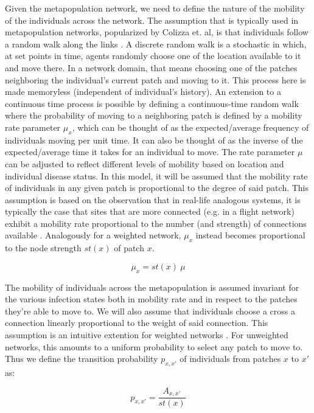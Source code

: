 Given the metapopulation network, we need to define the nature of the mobility of the individuals across the network. The assumption that is typically used in metapopulation networks, popularized by Colizza et. al, is that individuals follow a random walk along the links \cite{colizza2008epidemic}. A discrete random walk is a stochastic in which, at set points in time, agents randomly choose one of the location available to it and move there. In a network domain, that means choosing one of the patches neighboring the individual's current patch and moving to it. This process here is made memoryless (independent of individual's history). An extension to a continuous time process is possible by defining a continuous-time random walk where the probability of moving to a neighboring patch is defined by a mobility rate parameter $\mu_x$, which can be thought of as the expected/average frequency of individuals moving per unit time. It can also be thought of as the inverse of the expected/average time it takes for an individual to move. The rate parameter $\mu$ can be adjusted to reflect different levels of mobility based on location and individual disease status. In this model, it will be assumed that the mobility rate of individuals in any given patch is proportional to the degree of said patch. This assumption is based on the observation that in real-life analogous systems, it is typically the case that sites that are more connected (e.g. in a flight network) exhibit a mobility rate proportional to the number (and strength) of connections available \cite{colizza2006role}. Analogously for a weighted network, $\mu_x$ instead becomes proportional to the node strength $st(x)$ of patch $x$.

\begin{equation}
    \mu_x= st(x) \ \mu
\end{equation}

The mobility of individuals across the metapopulation is assumed invariant for the various infection states both in mobility rate and in respect to the patches they're able to move to. We will also assume that individuals choose a cross a connection linearly proportional to the weight of said connection. This assumption is an intuitive extention for weighted networks \cite{10.1093/comnet/cnab032}. For unweighted networks, this amounts to a uniform probability to select any patch to move to. Thus we define the transition probability $p_{x,x'}$ of individuals from patches $x$ to $x'$ as:

\begin{equation}
    p_{x,x'} =  \frac{A_{x,x'}}{st(x)}
\end{equation}

